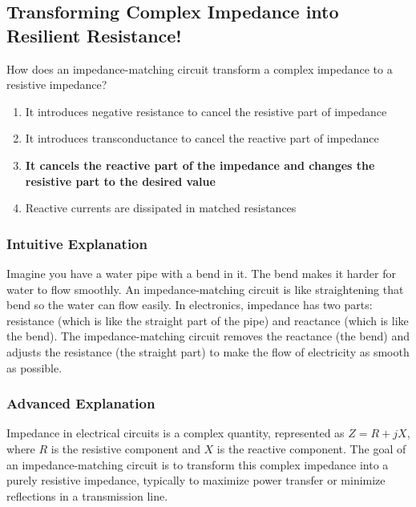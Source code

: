 \subsection{Transforming Complex Impedance into Resilient Resistance!}

\begin{tcolorbox}[colback=gray!10!white,colframe=black!75!black,title=E7C04] How does an impedance-matching circuit transform a complex impedance to a resistive impedance?
    \begin{enumerate}[label=\Alph*),noitemsep]
        \item It introduces negative resistance to cancel the resistive part of impedance
        \item It introduces transconductance to cancel the reactive part of impedance
        \item \textbf{It cancels the reactive part of the impedance and changes the resistive part to the desired value}
        \item Reactive currents are dissipated in matched resistances
    \end{enumerate}
\end{tcolorbox}

\subsubsection{Intuitive Explanation}
Imagine you have a water pipe with a bend in it. The bend makes it harder for water to flow smoothly. An impedance-matching circuit is like straightening that bend so the water can flow easily. In electronics, impedance has two parts: resistance (which is like the straight part of the pipe) and reactance (which is like the bend). The impedance-matching circuit removes the reactance (the bend) and adjusts the resistance (the straight part) to make the flow of electricity as smooth as possible.

\subsubsection{Advanced Explanation}
Impedance in electrical circuits is a complex quantity, represented as \( Z = R + jX \), where \( R \) is the resistive component and \( X \) is the reactive component. The goal of an impedance-matching circuit is to transform this complex impedance into a purely resistive impedance, typically to maximize power transfer or minimize reflections in a transmission line.

